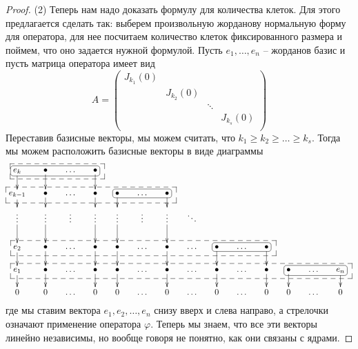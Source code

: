 \begin{proof}
(2) Теперь нам надо доказать формулу для количества клеток.
Для этого предлагается сделать так: выберем произвольную жорданову нормальную форму для оператора, для нее посчитаем количество клеток фиксированного размера и поймем, что оно задается нужной формулой.
Пусть $e_1,\ldots,e_n$ -- жорданов базис и пусть матрица оператора имеет вид
\[
A =
\begin{pmatrix}
{J_{k_1}(0)}&{}&{}&{}\\
{}&{J_{k_2}(0)}&{}&{}\\
{}&{}&{\ddots}&{}\\
{}&{}&{}&{J_{k_s}(0)}\\
\end{pmatrix}
\]
Переставив базисные векторы, мы можем считать, что $k_1 \geqslant k_2 \geqslant\ldots\geqslant k_s$.
Тогда мы можем расположить базисные векторы в виде диаграммы
\[
\xymatrix@R=15pt@C=15pt{
  {e_k}\ar[d]
  {\save
   [].[rrr]*[F-:<3pt>]\frm{}
  \restore}
  {\save
   [].[rrr]*+[F--]\frm{}
  \restore}&
  {\bullet}\ar[d]&{\ldots}&{\bullet}\ar[d]&
  {}&{}&{}&
  {}&
  {}&{}&{}&
  {}&{}&{}\\
  {e_{k-1}}\ar[d]
  {\save
   [].[rrrrrr]*+[F--]\frm{}
  \restore}&
  {\bullet}\ar[d]&{\ldots}&{\bullet}\ar[d]&
  {\bullet}\ar[d]
  {\save
   [].[rr]*[F-:<3pt>]\frm{}
  \restore}&{\ldots}&{\bullet}\ar[d]&
  {}&
  {}&{}&{}&
  {}&{}&{}\\
  {\vdots}\ar[d]&{\vdots}\ar[d]&{\vdots}&{\vdots}\ar[d]&
  {\vdots}\ar[d]&{\vdots}&{\vdots}\ar[d]&
  {\ddots}&
  {}&{}&{}&
  {}&{}&{}\\
  {e_2}\ar[d]
  {\save
   [].[rrrrrrrrrr]*+[F--]\frm{}
  \restore}&
  {\bullet}\ar[d]&{\ldots}&{\bullet}\ar[d]&
  {\bullet}\ar[d]&{\ldots}&{\bullet}\ar[d]&
  {\ldots}&
  {\bullet}\ar[d]
  {\save
   [].[rr]*[F-:<3pt>]\frm{}
  \restore}&{\ldots}&{\bullet}\ar[d]&
  {}&{}&{}\\
  {e_1}\ar[d]
  {\save
   [].[rrrrrrrrrrrrr]*+[F--]\frm{}
  \restore}&
  {\bullet}\ar[d]&{\ldots}&{\bullet}\ar[d]&
  {\bullet}\ar[d]&{\ldots}&{\bullet}\ar[d]&
  {\ldots}&
  {\bullet}\ar[d]&{\ldots}&{\bullet}\ar[d]&
  {\bullet}\ar[d]
  {\save
   [].[rr]*[F-:<3pt>]\frm{}
  \restore}&{\ldots}&{e_n}\ar[d]\\
  {0}&{0}&{\ldots}&{0}&
  {0}&{\ldots}&{0}&
  {\ldots}&
  {0}&{\ldots}&{0}&
  {0}&{\ldots}&{0}\\
}
\]
где мы ставим вектора $e_1, e_2, \ldots, e_n$ снизу вверх и слева направо, а стрелочки означают применение оператора $\varphi$.
Теперь мы знаем, что все эти векторы линейно независимы, но вообще говоря не понятно, как они связаны с ядрами.

\end{proof}
